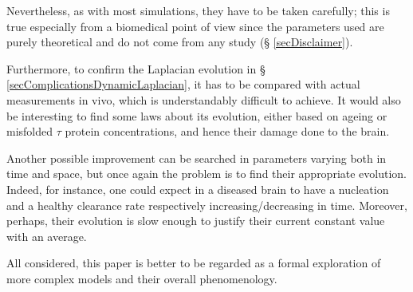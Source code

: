 \documentclass{article}
\begin{document}
        Nevertheless, as with most simulations, they have to be taken carefully; this is true especially from a biomedical point of view since the parameters used are purely theoretical and do not come from any study (§ \ref{secDisclaimer}).

        Furthermore, to confirm the Laplacian evolution in § \ref{secComplicationsDynamicLaplacian}, it has to be compared with actual measurements in vivo, which is understandably difficult to achieve. It would also be interesting to find some laws about its evolution, either based on ageing or misfolded $\tau$ protein concentrations, and hence their damage done to the brain.

        Another possible improvement can be searched in pa\-ra\-me\-ters varying both in time and space, but once again the problem is to find their appropriate evolution. Indeed, for instance, one could expect in a diseased brain to have a nucleation and a healthy clearance rate respectively increasing/decreasing in time. Moreover, perhaps, their evolution is slow enough to justify their current constant value with an average.

        All considered, this paper is better to be regarded as a formal exploration of more complex models and their overall phenomenology.



    \onecolumn
    \printbibliography %




    \twocolumn
    
\end{document}
